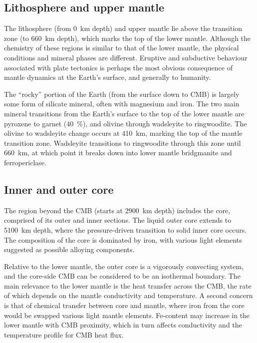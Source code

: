 \subsection{Lithosphere and upper mantle}

The lithosphere (from 0~km depth) and upper mantle lie above the transition zone (to 660~km depth), which marks the top of the lower mantle. Although the chemistry of these regions is similar to that of the lower mantle, the physical conditions and mineral phases are different. Eruptive and subductive behaviour associated with plate tectonics is perhaps the most obvious consequence of mantle dynamics at the Earth's surface, and generally to humanity.

The ``rocky'' portion of the Earth (from the surface down to CMB) is largely some form of silicate mineral, often with magnesium and iron. The two main mineral transitions from the Earth's surface to the top of the lower mantle are pyroxene to garnet (40~\%), and olivine through wadsleyite to ringwoodite\citep[60~\%][]{Tronnes2009}. The olivine to wadsleyite change occurs at 410~km, marking the top of the mantle transition zone. Wadsleyite transitions to ringwoodite through this zone until 660~km, at which point it breaks down into lower mantle bridgmanite and ferropericlase.

\subsection{Inner and outer core}

The region beyond the CMB (starts at 2900~km depth) includes the core, comprised of its outer and inner sections. The liquid outer core extends to 5100~km depth, where the pressure-driven transition to solid inner core occurs. The composition of the core is dominated by iron, with various light elements suggested as possible alloying components.

Relative to the lower mantle, the outer core is a vigorously convecting system, and the core-side CMB can be considered to be an isothermal boundary. The main relevance to the lower mantle is the heat transfer across the CMB, the rate of which depends on the mantle conductivity and temperature. A second concern is that of chemical transfer between core and mantle, where iron from the core would be swapped various light mantle elements. Fe-content may increase in the lower mantle with CMB proximity, which in turn affects conductivity and the temperature profile for CMB heat flux.





